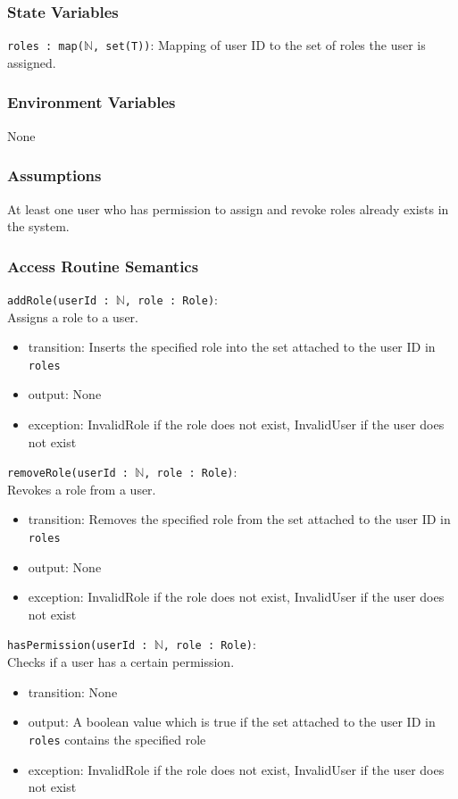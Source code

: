 \documentclass[12pt, titlepage]{article}
\begin{document}
\subsubsection{State Variables}

\texttt{roles : map($\mathbb{N}$, set(T))}: Mapping of user ID to the set of roles the user is assigned.

\subsubsection{Environment Variables}

None

\subsubsection{Assumptions}

At least one user who has permission to assign and revoke roles already exists in the system.

\subsubsection{Access Routine Semantics}

\noindent \texttt{addRole(userId : $\mathbb{N}$, role : Role)}: \\
Assigns a role to a user.
\begin{itemize}
\item transition: Inserts the specified role into the set attached to the user ID in \texttt{roles}
\item output: None
\item exception: InvalidRole if the role does not exist, InvalidUser if the user does not exist
\end{itemize}

\noindent \texttt{removeRole(userId : $\mathbb{N}$, role : Role)}: \\
Revokes a role from a user.
\begin{itemize}
\item transition: Removes the specified role from the set attached to the user ID in \texttt{roles}
\item output: None
\item exception: InvalidRole if the role does not exist, InvalidUser if the user does not exist
\end{itemize}

\noindent \texttt{hasPermission(userId : $\mathbb{N}$, role : Role)}: \\
Checks if a user has a certain permission.
\begin{itemize}
\item transition: None
\item output: A boolean value which is true if the set attached to the user ID in \texttt{roles} contains the specified role
\item exception: InvalidRole if the role does not exist, InvalidUser if the user does not exist
\end{itemize}
\end{document}

